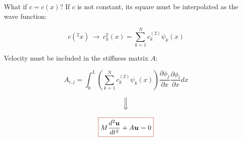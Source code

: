 \begin{frame}{What if $c=c(x)$?}
    If $c$ is not constant, its square must be interpolated as the wave function:

    \begin{equation*}
        c(^2x) \ \longrightarrow \ c_h^2(x)=\sum_{k=1}^Nc_k^{(2)}\psi_k(x)
    \end{equation*}

    \pause

    Velocity must be included in the stiffness matrix $A$:

    \begin{equation*}
        A_{i,j}=\int_0^L\left(\sum_{k=1}^Nc_k^{(2)}\psi_k(x)\right)\frac{\partial\phi_j}{\partial x}\frac{\partial\phi_i}{\partial x}dx
    \end{equation*}

    \pause

    \begin{equation*}
        \Big\Downarrow
    \end{equation*}

    \begin{equation*}
        \fcolorbox{BrickRed}{white}{\text{$\displaystyle M\frac{d^2\boldsymbol{u}}{dt^2}+A\boldsymbol{u}=0$}}
    \end{equation*}
\end{frame}


